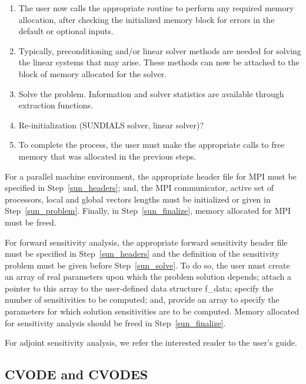 \begin{enumerate}
\item \label{sun_malloc}
The user now calls the appropriate routine to perform any required
memory allocation, after checking the initialized memory block for
errors in the default or optional inputs.

\item \label{sun_linear}
Typically, preconditioning and/or linear solver methods are needed for
solving the linear systems that may arise. These methods can now be
attached to the block of memory allocated for the solver.

\item \label{sun_solve}
Solve the problem. Information and solver statistics are available
through extraction functions.

\item \label{sun_reinit}
Re-initialization (SUNDIALS solver, linear solver)?

\item \label{sun_finalize}
To complete the process, the user must make the appropriate calls to
free memory that was allocated in the previous steps.

\end{enumerate}

For a parallel machine environment, the appropriate header file for
MPI must be specified in Step~\ref{sun_headers}; and, the MPI communicator,
active set of processors, local and global vectors lengths must be
initialized or given in Step~\ref{sun_problem}. Finally, in
Step~\ref{sun_finalize}, memory allocated for MPI must be freed.

For forward sensitivity analysis, the appropriate forward sensitivity
header file must be specified in Step~\ref{sun_headers} and the
definition of the sensitivity problem must be given before
Step~\ref{sun_solve}. To do so, the user must create an array of
real parameters upon which the problem solution depends; attach a pointer to
this array to the user-defined data structure f\_data; specify the
number of sensitivities to be computed; and, provide an array to
specify the parameters for which solution sensitivities are to be
computed. Memory allocated for sensitivity analysis should be freed in
Step~\ref{sun_finalize}.

{\sf For adjoint sensitivity analysis, we refer the interested reader to
the user's guide.}

\subsection{CVODE and CVODES} 
\label{ss:CVODE_usage}

